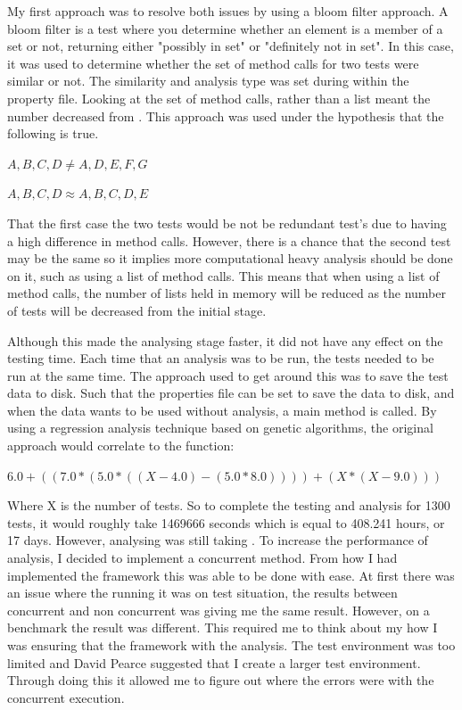 My first approach was to resolve both issues by using a bloom filter approach. A bloom filter is a test where you determine whether an element is a member of a set or not, returning either "possibly in set" or "definitely not in set". In this case, it was used to determine whether the set of method calls for two tests were similar or not. The similarity and analysis type was set during within the property file. Looking at the set of method calls, rather than a list meant the number decreased from . This approach was used under the hypothesis that the following is true.

$A, B, C, D \neq A, D, E, F, G$

$A, B, C, D \approx A, B, C, D, E$

That the first case the two tests would be not be redundant test’s due to having a high difference in method calls. However, there is a chance that the second test may be the same so it implies more computational heavy analysis should be done on it, such as using a list of method calls. This means that when using a list of method calls, the number of lists held in memory will be reduced as the number of tests will be decreased from the initial stage.

Although this made the analysing stage faster, it did not have any effect on the testing time. Each time that an analysis was to be run, the tests needed to be run at the same time. The approach used to get around this was to save the test data to disk. Such that the properties file can be set to save the data to disk, and when the data wants to be used without analysis, a main method is called. By using a regression analysis technique based on genetic algorithms, the original approach would correlate to the function:  

$6.0 + ((7.0 * (5.0 * ((X - 4.0) - (5.0 * 8.0)))) + (X * (X - 9.0)))$

Where X is the number of tests. So to complete the testing and analysis for 1300 tests, it would roughly take 1469666 seconds which is equal to 408.241 hours, or 17 days. However, analysing was still taking . To increase the performance of analysis, I decided to implement a concurrent method. From how I had implemented the framework this was able to be done with ease. At first there was an issue where the running it was on test situation, the results between concurrent and non concurrent was giving me the same result. However, on a benchmark the result was different. This required me to think about my how I was ensuring that the framework with the analysis. The test environment was too limited and David Pearce suggested that I create a larger test environment. Through doing this it allowed me to figure out where the errors were with the concurrent execution. 

